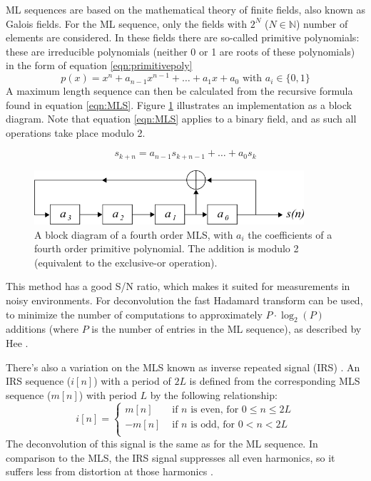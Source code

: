 ML sequences are based on the mathematical theory of finite fields, also known as Galois fields. For the ML sequence, only the fields with $2^N$ ($N\in\mathbb{N}$) number of elements are considered. In these fields there are so-called primitive polynomials: these are irreducible polynomials (neither 0 or 1 are roots of these polynomials) in the form of equation \ref{eqn:primitivepoly}
\begin{equation}
\label{eqn:primitivepoly}
p(x)=x^n+a_{n-1}x^{n-1}+\ldots+a_1x+a_0\text{ with }a_i\in\{0,1\}
\end{equation}
A maximum length sequence can then be calculated from the recursive formula found in equation \ref{eqn:MLS}. Figure \ref{fig:register} illustrates an implementation as a block diagram. Note that equation \ref{eqn:MLS} applies to a binary field, and as such all operations take place modulo 2.

\begin{equation}
\label{eqn:MLS}
s_{k+n}=a_{n-1}s_{k+n-1}+\ldots+a_0s_k
\end{equation}

\begin{figure} [b!]
    \centering
    \includegraphics[width=10cm]{images/Directivity_MLS.png}
    \caption{A block diagram of a fourth order MLS, with $a_i$ the coefficients of a fourth order primitive polynomial. The addition is modulo 2 (equivalent to the exclusive-or operation).}
    \label{fig:register}
\end{figure}

This method has a good S/N ratio, which makes it suited for measurements in noisy environments. For deconvolution the fast Hadamard transform can be used, to minimize the number of computations to approximately $P\cdot\log_2(P)$ additions (where $P$ is the number of entries in the ML sequence), as described by Hee \cite{hee2003}.

There's also a variation on the MLS known as inverse repeated signal (IRS) \cite{Stan2002249}. An IRS sequence ($i[n]$) with a period of $2L$ is defined from the corresponding MLS sequence ($m[n]$) with period $L$ by the following relationship:
\[
i[n]=\left\{
\begin{array}{ll}
m[n]&\text{ if }n\text{ is even, for }0\leq n \leq 2L\\
-m[n]&\text{ if }n\text{ is odd, for }0< n < 2L\\
\end{array}
\right.
\]
The deconvolution of this signal is the same as for the ML sequence. In comparison to the MLS, the IRS signal suppresses all even harmonics, so it suffers less from distortion at those harmonics \cite{Barker1999717}.

